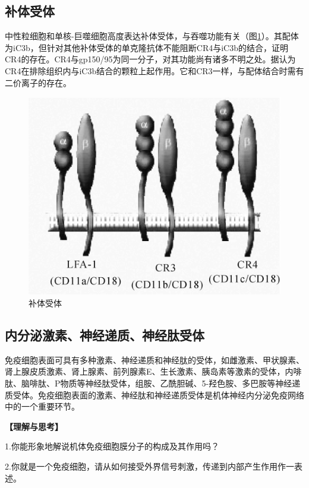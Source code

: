 \subsection{补体受体}

中性粒细胞和单核-巨噬细胞高度表达补体受体，与吞噬功能有关（图\ref{fig8-15}）。其配体为iC3b，但针对其他补体受体的单克隆抗体不能阻断CR4与iC3b的结合，证明CR4的存在。CR4与gp150/95为同一分子，对其功能尚有诸多不明之处。据认为CR4在排除组织内与iC3b结合的颗粒上起作用。它和CR3一样，与配体结合时需有二价离子的存在。

\begin{figure}[!htbp]
 \centering
 \includegraphics{./images/Image00125.jpg}
 \captionsetup{justification=centering}
 \caption{补体受体}
 \label{fig8-15}
  \end{figure} 


\subsection{内分泌激素、神经递质、神经肽受体}

免疫细胞表面可具有多种激素、神经递质和神经肽的受体，如雌激素、甲状腺素、肾上腺皮质激素、肾上腺素、前列腺素E、生长激素、胰岛素等激素的受体，内啡肽、脑啡肽、P物质等神经肽受体，组胺、乙酰胆碱、5-羟色胺、多巴胺等神经递质受体。免疫细胞表面的激素、神经肽和神经递质受体是机体神经内分泌免疫网络中的一个重要环节。

\noindent\textbf{【理解与思考】}

1.你能形象地解说机体免疫细胞膜分子的构成及其作用吗？

2.你就是一个免疫细胞，请从如何接受外界信号刺激，传递到内部产生作用作一表述。

